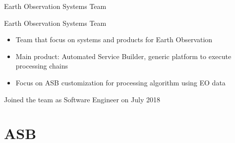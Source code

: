 \documentclass[10pt]{beamer}
\begin{document}
\begin{frame}{Earth Observation Systems Team}
  \begin{block}{Earth Observation Systems Team}
      \begin{itemize}
          \item Team that focus on systems and products for Earth Observation
          \item Main product: Automated Service Builder, generic
          platform to execute processing chains
          \item Focus on ASB customization for processing algorithm using EO data
      \end{itemize}
      \begin{center}
      Joined the team as Software Engineer on July 2018
      \end{center}
  \end{block}


\end{frame}

\section{ASB}


\end{document}
